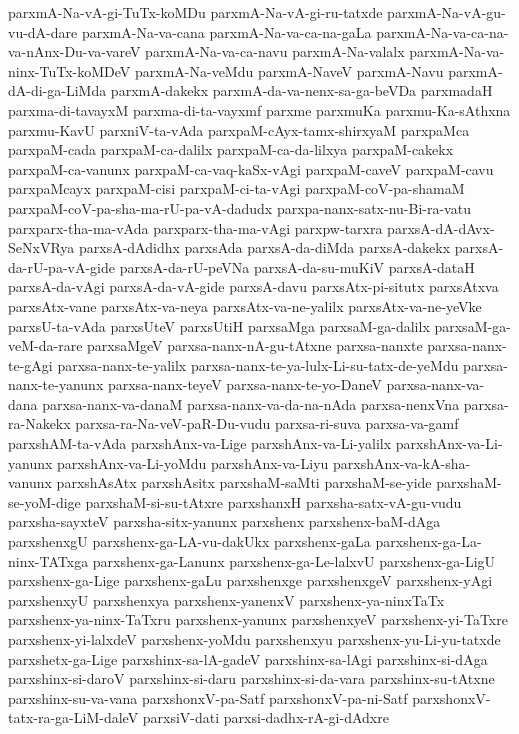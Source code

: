 {parxmA-Na-vA-gi-TuTx-koMDu
parxmA-Na-vA-gi-ru-tatxde
parxmA-Na-vA-gu-vu-dA-dare
parxmA-Na-va-cana
parxmA-Na-va-ca-na-gaLa
parxmA-Na-va-ca-na-va-nAnx-Du-va-vareV
parxmA-Na-va-ca-navu
parxmA-Na-valalx
parxmA-Na-va-ninx-TuTx-koMDeV
parxmA-Na-veMdu
parxmA-NaveV
parxmA-Navu
parxmA-dA-di-ga-LiMda
parxmA-dakekx
parxmA-da-va-nenx-sa-ga-beVDa
parxmadaH
parxma-di-tavayxM
parxma-di-ta-vayxmf
parxme
parxmuKa
parxmu-Ka-sAthxna
parxmu-KavU
parxniV-ta-vAda
parxpaM-cAyx-tamx-shirxyaM
parxpaMca
parxpaM-cada
parxpaM-ca-dalilx
parxpaM-ca-da-lilxya
parxpaM-cakekx
parxpaM-ca-vanunx
parxpaM-ca-vaq-kaSx-vAgi
parxpaM-caveV
parxpaM-cavu
parxpaMcayx
parxpaM-cisi
parxpaM-ci-ta-vAgi
parxpaM-coV-pa-shamaM
parxpaM-coV-pa-sha-ma-rU-pa-vA-dadudx
parxpa-nanx-satx-nu-Bi-ra-vatu
parxparx-tha-ma-vAda
parxparx-tha-ma-vAgi
parxpw-tarxra
parxsA-dA-dAvx-SeNxVRya
parxsA-dAdidhx
parxsAda
parxsA-da-diMda
parxsA-dakekx
parxsA-da-rU-pa-vA-gide
parxsA-da-rU-peVNa
parxsA-da-su-muKiV
parxsA-dataH
parxsA-da-vAgi
parxsA-da-vA-gide
parxsA-davu
parxsAtx-pi-situtx
parxsAtxva
parxsAtx-vane
parxsAtx-va-neya
parxsAtx-va-ne-yalilx
parxsAtx-va-ne-yeVke
parxsU-ta-vAda
parxsUteV
parxsUtiH
parxsaMga
parxsaM-ga-dalilx
parxsaM-ga-veM-da-rare
parxsaMgeV
parxsa-nanx-nA-gu-tAtxne
parxsa-nanxte
parxsa-nanx-te-gAgi
parxsa-nanx-te-yalilx
parxsa-nanx-te-ya-lulx-Li-su-tatx-de-yeMdu
parxsa-nanx-te-yanunx
parxsa-nanx-teyeV
parxsa-nanx-te-yo-DaneV
parxsa-nanx-va-dana
parxsa-nanx-va-danaM
parxsa-nanx-va-da-na-nAda
parxsa-nenxVna
parxsa-ra-Nakekx
parxsa-ra-Na-veV-paR-Du-vudu
parxsa-ri-suva
parxsa-va-gamf
parxshAM-ta-vAda
parxshAnx-va-Lige
parxshAnx-va-Li-yalilx
parxshAnx-va-Li-yanunx
parxshAnx-va-Li-yoMdu
parxshAnx-va-Liyu
parxshAnx-va-kA-sha-vanunx
parxshAsAtx
parxshAsitx
parxshaM-saMti
parxshaM-se-yide
parxshaM-se-yoM-dige
parxshaM-si-su-tAtxre
parxshanxH
parxsha-satx-vA-gu-vudu
parxsha-sayxteV
parxsha-sitx-yanunx
parxshenx
parxshenx-baM-dAga
parxshenxgU
parxshenx-ga-LA-vu-dakUkx
parxshenx-gaLa
parxshenx-ga-La-ninx-TATxga
parxshenx-ga-Lanunx
parxshenx-ga-Le-lalxvU
parxshenx-ga-LigU
parxshenx-ga-Lige
parxshenx-gaLu
parxshenxge
parxshenxgeV
parxshenx-yAgi
parxshenxyU
parxshenxya
parxshenx-yanenxV
parxshenx-ya-ninxTaTx
parxshenx-ya-ninx-TaTxru
parxshenx-yanunx
parxshenxyeV
parxshenx-yi-TaTxre
parxshenx-yi-lalxdeV
parxshenx-yoMdu
parxshenxyu
parxshenx-yu-Li-yu-tatxde
parxshetx-ga-Lige
parxshinx-sa-lA-gadeV
parxshinx-sa-lAgi
parxshinx-si-dAga
parxshinx-si-daroV
parxshinx-si-daru
parxshinx-si-da-vara
parxshinx-su-tAtxne
parxshinx-su-va-vana
parxshonxV-pa-Satf
parxshonxV-pa-ni-Satf
parxshonxV-tatx-ra-ga-LiM-daleV
parxsiV-dati
parxsi-dadhx-rA-gi-dAdxre
}
